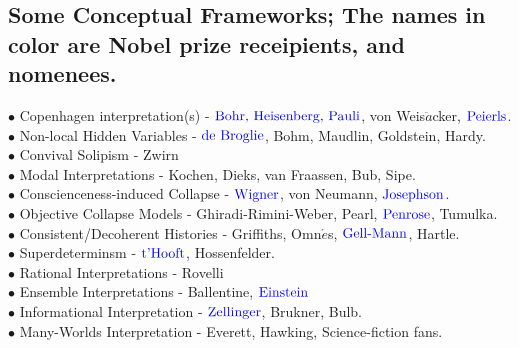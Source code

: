 \documentclass[10pt,fancy]{elegantbook}
\begin{document}
{\subsection{Some Conceptual Frameworks; The names in color are Nobel prize receipients, and nomenees.}

$\bullet$ Copenhagen interpretation(s) - $\color{blue}{\text{Bohr, Heisenberg, Pauli}}$, von Weis$\ddot{a}$cker, $\color{blue}{\text{Peierls}}$. \\  

$\bullet$ Non-local Hidden Variables - $\color{blue}{\text{de Broglie}}$, Bohm, Maudlin, Goldstein, Hardy. \\  

$\bullet$ Convival Solipism - Zwirn \\ 

$\bullet$ Modal Interpretations - Kochen, Dieks, van Fraassen, Bub, Sipe.  \\

$\bullet$ Conscienceness-induced Collapse - $\color{blue}{\text{Wigner}}$, von Neumann, $\color{blue}{\text{Josephson}}$.  \\

$\bullet$ Objective Collapse Models - Ghiradi-Rimini-Weber, Pearl, $\color{blue}{\text{Penrose}}$, Tumulka.  \\

$\bullet$ Consistent/Decoherent Histories - Griffiths, Omn$\acute{e}$s, $\color{blue}{\text{Gell-Mann}}$, Hartle.  \\

$\bullet$ Superdeterminsm - $\color{blue}{\text{t'Hooft}}$, Hossenfelder.  \\
                                                
$\bullet$ Rational Interpretations - Rovelli \\
                                                
$\bullet$ Ensemble Interpretations - Ballentine, $\color{blue}{\text{Einstein}}$  \\
                                                
$\bullet$ Informational Interpretation - $\color{blue}{\text{Zellinger}}$, Brukner, Bulb.  \\
                                                
$\bullet$ Many-Worlds Interpretation - Everett, Hawking, Science-fiction fans. \\


\begin{remark}  \\


\end{remark}}
\end{document}
